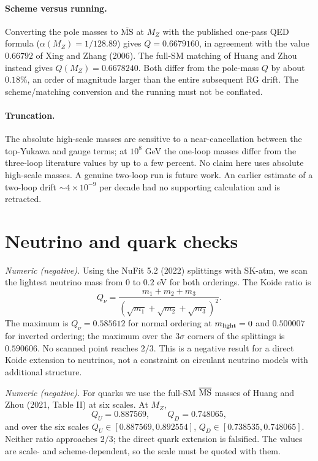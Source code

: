 \documentclass[11pt]{article}
\begin{document}
\paragraph{Scheme versus running.} Converting the pole masses to
$\overline{\mathrm{MS}}$ at $M_Z$ with the published one-pass QED formula
($\alpha(M_Z)=1/128.89$) gives $Q=0.6679160$, in agreement with the value
$0.66792$ of Xing and Zhang (2006). The full-SM matching of Huang and Zhou
instead gives $Q(M_Z)=0.6678240$. Both differ from the pole-mass $Q$ by about
$0.18\%$, an order of magnitude larger than the entire subsequent RG drift.
The scheme/matching conversion and the running must not be conflated.

\paragraph{Truncation.} The absolute high-scale masses are sensitive to a
near-cancellation between the top-Yukawa and gauge terms; at $10^8$ GeV the
one-loop masses differ from the three-loop literature values by up to a few
percent. No claim here uses absolute high-scale masses. A genuine two-loop run
is future work. An earlier estimate of a two-loop drift
$\sim4\times10^{-9}$ per decade had no supporting calculation and is retracted.

\section{Neutrino and quark checks}
\label{sec:nuquark}

\emph{Numeric (negative).} Using the NuFit 5.2 (2022) splittings with SK-atm,
we scan the lightest neutrino mass from $0$ to $0.2$ eV for both orderings.
The Koide ratio is
\begin{equation}
Q_\nu=\frac{m_1+m_2+m_3}{(\sqrt{m_1}+\sqrt{m_2}+\sqrt{m_3})^2}.
\label{eq:Qnu}
\end{equation}
The maximum is $Q_\nu=0.585612$ for normal ordering at $m_{\rm light}=0$ and
$0.500007$ for inverted ordering; the maximum over the $3\sigma$ corners of the
splittings is $0.590606$. No scanned point reaches $2/3$. This is a negative
result for a direct Koide extension to neutrinos, not a constraint on
circulant neutrino models with additional structure.

\emph{Numeric (negative).} For quarks we use the full-SM
$\overline{\rm MS}$ masses of Huang and Zhou (2021, Table II) at six scales.
At $M_Z$,
\begin{equation}
Q_U=0.887569,\qquad Q_D=0.748065,
\label{eq:Qquark}
\end{equation}
and over the six scales $Q_U\in[0.887569,0.892554]$,
$Q_D\in[0.738535,0.748065]$. Neither ratio approaches $2/3$; the direct quark
extension is falsified. The values are scale- and scheme-dependent, so the
scale must be quoted with them.
\end{document}
